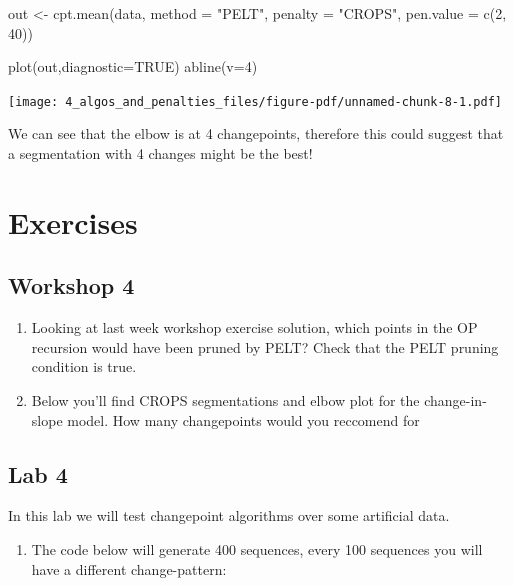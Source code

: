 \documentclass[
  letterpaper,
  DIV=11,
  numbers=noendperiod]{scrreprt}
\newenvironment{Shaded}{\begin{snugshade}}{\end{snugshade}}
\newcommand{\AttributeTok}[1]{\textcolor[rgb]{0.40,0.45,0.13}{#1}}
\newcommand{\ConstantTok}[1]{\textcolor[rgb]{0.56,0.35,0.01}{#1}}
\newcommand{\DecValTok}[1]{\textcolor[rgb]{0.68,0.00,0.00}{#1}}
\newcommand{\FunctionTok}[1]{\textcolor[rgb]{0.28,0.35,0.67}{#1}}
\newcommand{\NormalTok}[1]{\textcolor[rgb]{0.00,0.23,0.31}{#1}}
\newcommand{\OtherTok}[1]{\textcolor[rgb]{0.00,0.23,0.31}{#1}}
\newcommand{\StringTok}[1]{\textcolor[rgb]{0.13,0.47,0.30}{#1}}
\providecommand{\tightlist}{%
  \setlength{\itemsep}{0pt}\setlength{\parskip}{0pt}}\usepackage{longtable,booktabs,array}
\begin{document}
\begin{Shaded}
\begin{Highlighting}[]
\NormalTok{out }\OtherTok{\textless{}{-}} \FunctionTok{cpt.mean}\NormalTok{(data, }\AttributeTok{method =} \StringTok{"PELT"}\NormalTok{, }\AttributeTok{penalty  =} \StringTok{"CROPS"}\NormalTok{, }\AttributeTok{pen.value =} \FunctionTok{c}\NormalTok{(}\DecValTok{2}\NormalTok{, }\DecValTok{40}\NormalTok{))}

\FunctionTok{plot}\NormalTok{(out,}\AttributeTok{diagnostic=}\ConstantTok{TRUE}\NormalTok{)}
\FunctionTok{abline}\NormalTok{(}\AttributeTok{v=}\DecValTok{4}\NormalTok{)}
\end{Highlighting}
\end{Shaded}

\texttt{[image: 4\_algos\_and\_penalties\_files/figure-pdf/unnamed-chunk-8-1.pdf]}

We can see that the elbow is at 4 changepoints, therefore this could
suggest that a segmentation with 4 changes might be the best!

\section{Exercises}\label{exercises-3}

\subsection{Workshop 4}\label{workshop-4}

\begin{enumerate}
\def\labelenumi{\arabic{enumi}.}
\item
  Looking at last week workshop exercise solution, which points in the
  OP recursion would have been pruned by PELT? Check that the PELT
  pruning condition is true.
\item
  Below you'll find CROPS segmentations and elbow plot for the
  change-in-slope model. How many changepoints would you reccomend for
\end{enumerate}

\subsection{Lab 4}\label{lab-4}

In this lab we will test changepoint algorithms over some artificial
data.

\begin{enumerate}
\def\labelenumi{\arabic{enumi}.}
\tightlist
\item
  The code below will generate 400 sequences, every 100 sequences you
  will have a different change-pattern:
\end{enumerate}
\end{document}
